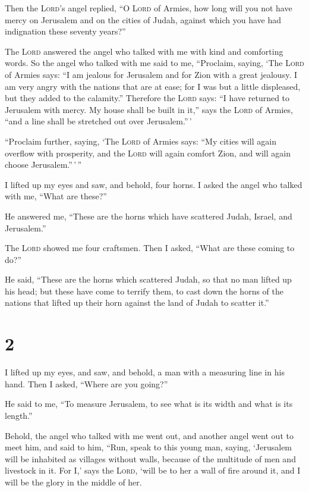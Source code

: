  Then the \textsc{Lord}'s angel replied, ``O
\textsc{Lord} of Armies, how long will you not have mercy on Jerusalem
and on the cities of Judah, against which you have had indignation these
seventy years?''

 The \textsc{Lord} answered the angel who talked with me
with kind and comforting words.  So the angel who talked
with me said to me, ``Proclaim, saying, `The \textsc{Lord} of Armies
says: ``I am jealous for Jerusalem and for Zion with a great jealousy.
 I am very angry with the nations that are at ease; for I
was but a little displeased, but they added to the calamity.''
 Therefore the \textsc{Lord} says: ``I have returned to
Jerusalem with mercy. My house shall be built in it,'' says the
\textsc{Lord} of Armies, ``and a line shall be stretched out over
Jerusalem.''\,'

 ``Proclaim further, saying, `The \textsc{Lord} of Armies
says: ``My cities will again overflow with prosperity, and the
\textsc{Lord} will again comfort Zion, and will again choose
Jerusalem.''\,'\,''

 I lifted up my eyes and saw, and behold, four horns.
 I asked the angel who talked with me, ``What are
these?''

He answered me, ``These are the horns which have scattered Judah,
Israel, and Jerusalem.''

 The \textsc{Lord} showed me four craftsmen.
 Then I asked, ``What are these coming to do?''

He said, ``These are the horns which scattered Judah, so that no man
lifted up his head; but these have come to terrify them, to cast down
the horns of the nations that lifted up their horn against the land of
Judah to scatter it.''

\hypertarget{section-1}{%
\section{2}\label{section-1}}

 I lifted up my eyes, and saw, and behold, a man with a
measuring line in his hand.  Then I asked, ``Where are you
going?''

He said to me, ``To measure Jerusalem, to see what is its width and what
is its length.''

 Behold, the angel who talked with me went out, and
another angel went out to meet him,  and said to him,
``Run, speak to this young man, saying, `Jerusalem will be inhabited as
villages without walls, because of the multitude of men and livestock in
it.  For I,' says the \textsc{Lord}, `will be to her a
wall of fire around it, and I will be the glory in the middle of her.

